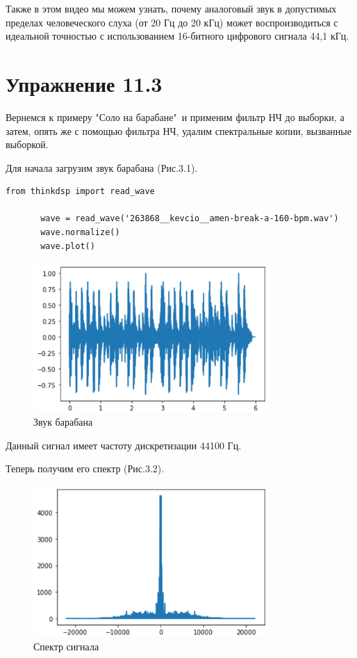 \documentclass[a4paper,12pt]{report}
\begin{document}
    Также в этом видео мы можем узнать, почему аналоговый звук в допустимых пределах человеческого слуха (от 20 Гц до 20 кГц) может воспроизводиться с идеальной точностью с использованием 16-битного цифрового сигнала 44,1 кГц.
    
\chapter{Упражнение 11.3}
    Вернемся к примеру "Соло на барабане"\ и применим фильтр НЧ до выборки, а затем, опять же с помощью фильтра НЧ, удалим спектральные копии, вызванные выборкой.
    
    Для начала загрузим звук барабана (Рис.3.1).
\begin{lstlisting}[caption=Получение звука барабана]
       from thinkdsp import read_wave

       wave = read_wave('263868__kevcio__amen-break-a-160-bpm.wav')
       wave.normalize()
       wave.plot()
\end{lstlisting}
\begin{figure}[H]
        \centering
        \includegraphics[width=0.8\textwidth]{fig3-1.PNG}
        \caption{Звук барабана}
        \label{fig:fig3-1}
\end{figure} 

    Данный сигнал имеет частоту дискретизации 44100 Гц.

    Теперь получим его спектр (Рис.3.2).
\begin{figure}[H]
        \centering
        \includegraphics[width=0.8\textwidth]{fig3-2.PNG}
        \caption{Спектр сигнала}
        \label{fig:fig3-2}
\end{figure}
\end{document}
